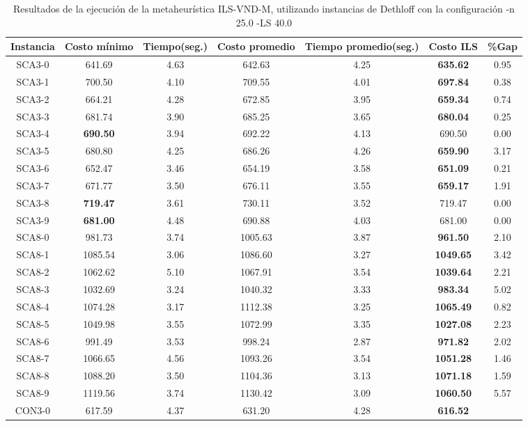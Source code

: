 \begin{table}[h]
\caption{Resultados de la ejecución de la metaheurística ILS-VND-M, utilizando instancias de Dethloff con la configuración -n 25.0 -LS 40.0}
\centering
\small
\begin{tabular}{c c c c c c c}
\hline\hline
Instancia & Costo mínimo & Tiempo(seg.) & Costo promedio & Tiempo promedio(seg.) & Costo ILS & \%Gap \\ [0.5ex]
\hline
SCA3-0 & 641.69 & 4.63 & 
642.63 & 4.25 & \bf{635.62} & 
0.95\\SCA3-1 & 700.50 & 4.10 & 
709.55 & 4.01 & \bf{697.84} & 
0.38\\SCA3-2 & 664.21 & 4.28 & 
672.85 & 3.95 & \bf{659.34} & 
0.74\\SCA3-3 & 681.74 & 3.90 & 
685.25 & 3.65 & \bf{680.04} & 
0.25\\SCA3-4 & \bf{690.50} & 3.94 & 
692.22 & 4.13 & 690.50 & 0.00\\
SCA3-5 & 680.80 & 4.25 & 
686.26 & 4.26 & \bf{659.90} & 
3.17\\SCA3-6 & 652.47 & 3.46 & 
654.19 & 3.58 & \bf{651.09} & 
0.21\\SCA3-7 & 671.77 & 3.50 & 
676.11 & 3.55 & \bf{659.17} & 
1.91\\SCA3-8 & \bf{719.47} & 3.61 & 
730.11 & 3.52 & 719.47 & 0.00\\
SCA3-9 & \bf{681.00} & 4.48 & 
690.88 & 4.03 & 681.00 & 0.00\\
SCA8-0 & 981.73 & 3.74 & 
1005.63 & 3.87 & \bf{961.50} & 
2.10\\SCA8-1 & 1085.54 & 3.06 & 
1086.60 & 3.27 & \bf{1049.65} & 
3.42\\SCA8-2 & 1062.62 & 5.10 & 
1067.91 & 3.54 & \bf{1039.64} & 
2.21\\SCA8-3 & 1032.69 & 3.24 & 
1040.32 & 3.33 & \bf{983.34} & 
5.02\\SCA8-4 & 1074.28 & 3.17 & 
1112.38 & 3.25 & \bf{1065.49} & 
0.82\\SCA8-5 & 1049.98 & 3.55 & 
1072.99 & 3.35 & \bf{1027.08} & 
2.23\\SCA8-6 & 991.49 & 3.53 & 
998.24 & 2.87 & \bf{971.82} & 
2.02\\SCA8-7 & 1066.65 & 4.56 & 
1093.26 & 3.54 & \bf{1051.28} & 
1.46\\SCA8-8 & 1088.20 & 3.50 & 
1104.36 & 3.13 & \bf{1071.18} & 
1.59\\SCA8-9 & 1119.56 & 3.74 & 
1130.42 & 3.09 & \bf{1060.50} & 
5.57\\CON3-0 & 617.59 & 4.37 & 
631.20 & 4.28 & \bf{616.52} & 

\end{tabular}
\end{table}

